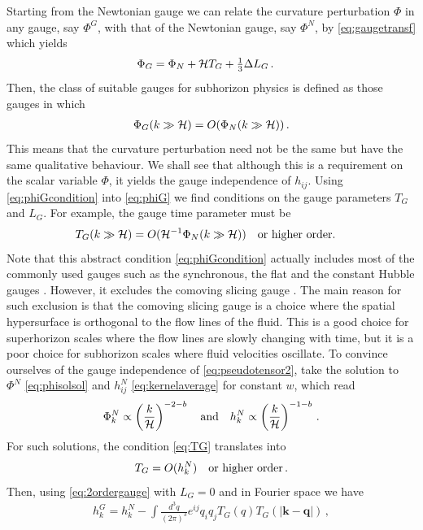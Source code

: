 \documentclass[a4paper,11pt]{article}
\numberwithin{equation}{section}
\begin{document}
Starting from the Newtonian gauge we can relate the curvature perturbation $\Phi$ in any gauge, say $\Phi^G$, with that of the Newtonian gauge, say $\Phi^N$, by \eqref{eq:gaugetransf} which yields
\begin{align}\label{eq:phiG}
\Phi_G&= \Phi_N+{\cal H}T_G+\tfrac{1}{3}\Delta L_G\,.
\end{align}
Then, the class of suitable gauges for subhorizon physics is defined as those gauges in which
\begin{align}\label{eq:phiGcondition}
\Phi_G(k\gg{\cal H})=O(\Phi_N(k\gg{\cal H}))\,.
\end{align}
This means that the curvature perturbation need not be the same but have the same qualitative behaviour. We shall see that although this is a requirement on the scalar variable $\Phi$, it yields the gauge independence of $h_{ij}$. Using \eqref{eq:phiGcondition} into \eqref{eq:phiG} we find conditions on the gauge parameters $T_G$ and $L_G$. For example, the gauge time parameter must be
\begin{align}\label{eq:TG}
T_G(k\gg{\cal H})&=O({\cal H}^{-1}\Phi_N(k\gg{\cal H}))\quad{\rm or\,\,higher\,\,order}.
\end{align}
Note that this abstract condition \eqref{eq:phiGcondition} actually includes most of the commonly used gauges such as the synchronous, the flat and the constant Hubble gauges \cite{Domenech:2020xin}. However, it excludes the comoving slicing gauge \cite{Domenech:2020xin}. The main reason for such exclusion is that the comoving slicing gauge is a choice where the spatial hypersurface is orthogonal to the flow lines of the fluid. This is a good choice for superhorizon scales where the flow lines are slowly changing with time, but it is a poor choice for subhorizon scales where fluid velocities oscillate. To convince ourselves of the gauge independence of \eqref{eq:pseudotensor2}, take the solution to $\Phi^N$ \eqref{eq:phisolsol} and $h_{ij}^N$ \eqref{eq:kernelaverage} for constant $w$, which read
\begin{align}
\Phi_k^N\propto \left(\frac{k}{{\cal H}}\right)^{-2-b}\quad{\rm and}\quad h_k^N\propto \left(\frac{k}{{\cal H}}\right)^{-1-b}\,.
\end{align}
For such solutions, the condition \eqref{eq:TG} translates into
\begin{align}\label{eq:TGNew}
T_G=O(h^N_k)\quad{\rm or\,\, higher\,\, order}\,.
\end{align}
Then, using \eqref{eq:2ordergauge} with $L_G=0$ and in Fourier space we have
\begin{align}\label{eq:2ordergauge3}
h^G_{k}=h^N_{k}-\int \frac{d^3q}{(2\pi)^3}e^{ij}q_iq_jT_G(q)T_G(|\mathbf{k}-\mathbf{q}|)\,,
\end{align}
\end{document}
